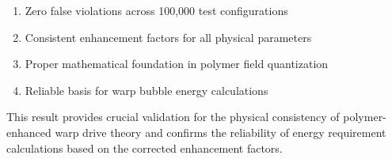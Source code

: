 \documentclass[11pt,a4paper]{article}
\begin{document}
\begin{enumerate}
\item Zero false violations across 100,000 test configurations
\item Consistent enhancement factors for all physical parameters
\item Proper mathematical foundation in polymer field quantization
\item Reliable basis for warp bubble energy calculations
\end{enumerate}

This result provides crucial validation for the physical consistency of polymer-enhanced warp drive theory and confirms the reliability of energy requirement calculations based on the corrected enhancement factors.
\end{document}
